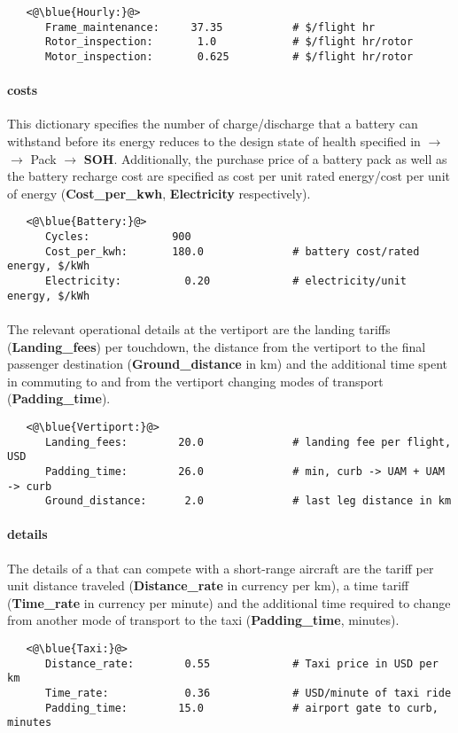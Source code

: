 \begin{lstlisting}
   <@\blue{Hourly:}@>
      Frame_maintenance:     37.35           # $/flight hr 
      Rotor_inspection:       1.0            # $/flight hr/rotor 
      Motor_inspection:       0.625          # $/flight hr/rotor 
\end{lstlisting}

\paragraph{ costs}
This dictionary specifies the number of charge/discharge  that a battery can withstand before its energy reduces to the design state of health specified in  $\rightarrow$  $\rightarrow$ Pack $\rightarrow$ \textbf{SOH}. Additionally, the purchase price of a battery pack as well as the battery recharge cost are specified as cost per unit rated energy/cost per unit of energy (\textbf{Cost\_per\_kwh}, \textbf{Electricity} respectively).

\begin{lstlisting}
   <@\blue{Battery:}@>
      Cycles:             900
      Cost_per_kwh:       180.0              # battery cost/rated energy, $/kWh
      Electricity:          0.20             # electricity/unit energy, $/kWh
\end{lstlisting}

\paragraph{}
The relevant operational details at the vertiport are the landing tariffs (\textbf{Landing\_fees}) per touchdown, the distance from the vertiport to the final passenger destination (\textbf{Ground\_distance} in km) and the additional time spent in commuting to and from the vertiport changing modes of transport (\textbf{Padding\_time}).

\begin{lstlisting}
   <@\blue{Vertiport:}@>
      Landing_fees:        20.0              # landing fee per flight, USD
      Padding_time:        26.0              # min, curb -> UAM + UAM -> curb 
      Ground_distance:      2.0              # last leg distance in km
\end{lstlisting}

\paragraph{ details}
The details of a  that can compete with a short-range aircraft are the tariff per unit distance traveled (\textbf{Distance\_rate} in currency per km), a time tariff (\textbf{Time\_rate} in currency per minute) and the additional time required to change from another mode of transport to the taxi (\textbf{Padding\_time}, minutes).
\begin{lstlisting}
   <@\blue{Taxi:}@>
      Distance_rate:        0.55             # Taxi price in USD per km 
      Time_rate:            0.36             # USD/minute of taxi ride
      Padding_time:        15.0              # airport gate to curb, minutes
\end{lstlisting}

